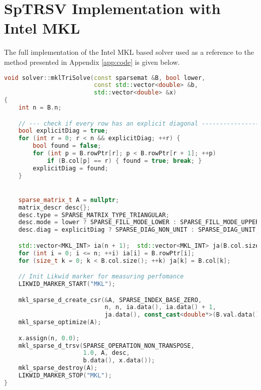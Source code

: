 \chapter{SpTRSV Implementation with Intel MKL}
\label{app:code_mkl}
The full implementation of the Intel MKL based solver used as a reference to the method presented in Appendix \ref{app:code} is given below.
\begin{lstlisting}[language=C++,caption={Full implementation of the
\texttt{MKL SpTRSV} kernel.}]
    void solver::mklTriSolve(const sparsemat &B, bool lower,
                         const std::vector<double> &b,
                         std::vector<double> &x)
{
    int n = B.n;

    // --- check if every row has an explicit diagonal --------------------
    bool explicitDiag = true;
    for (int r = 0; r < n && explicitDiag; ++r) {
        bool found = false;
        for (int p = B.rowPtr[r]; p < B.rowPtr[r + 1]; ++p)
            if (B.col[p] == r) { found = true; break; }
        explicitDiag = found;
    }


    sparse_matrix_t A = nullptr;
    matrix_descr desc{};
    desc.type = SPARSE_MATRIX_TYPE_TRIANGULAR;
    desc.mode = lower ? SPARSE_FILL_MODE_LOWER : SPARSE_FILL_MODE_UPPER;
    desc.diag = explicitDiag ? SPARSE_DIAG_NON_UNIT : SPARSE_DIAG_UNIT;

    std::vector<MKL_INT> ia(n + 1);  std::vector<MKL_INT> ja(B.col.size());
    for (int i = 0; i <= n; ++i) ia[i] = B.rowPtr[i];
    for (size_t k = 0; k < B.col.size(); ++k) ja[k] = B.col[k];

    // Init Likwid marker for measuring perfomance
    LIKWID_MARKER_START("MKL");

    mkl_sparse_d_create_csr(&A, SPARSE_INDEX_BASE_ZERO,
                            n, n, ia.data(), ia.data() + 1,
                            ja.data(), const_cast<double*>(B.val.data()));
    mkl_sparse_optimize(A);

    x.assign(n, 0.0);
    mkl_sparse_d_trsv(SPARSE_OPERATION_NON_TRANSPOSE,
                      1.0, A, desc,
                      b.data(), x.data());
    mkl_sparse_destroy(A);
    LIKWID_MARKER_STOP("MKL");
}
\end{lstlisting}
